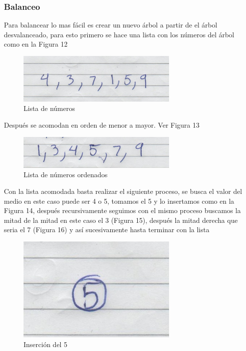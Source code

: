\subsubsection{Balanceo}
Para balancear lo mas fácil es crear un nuevo árbol a partir de el árbol desvalanceado, para esto primero se hace una lista con los números del árbol
como en la Figura 12
\begin{figure}[H]
	\centering
	\includegraphics[width=0.7\textwidth]{./images/otraimagen1.jpg}
	\caption{Lista de números}
\end{figure}
Después se acomodan en orden de menor a mayor. Ver Figura 13
\begin{figure}[H]
	\centering
	\includegraphics[width=0.7\textwidth]{./images/otraimagen2.jpg}
	\caption{Lista de números ordenados}
\end{figure}
Con la lista acomodada basta realizar el siguiente proceso, se busca el valor del medio en este caso puede ser 4 o 5, tomamos el 5 y lo insertamos como en la Figura
14, después recursivamente seguimos con el mismo proceso buscamos la mitad de la mitad en este caso el 3 (Figura 15), después la mitad derecha que seria el 7 (Figura 16)
y así sucesivamente hasta terminar con la lista
\begin{figure}[H]
	\centering
	\includegraphics[width=0.7\textwidth]{./images/otraimagen3.jpg}
	\caption{Inserción del 5}
\end{figure}
